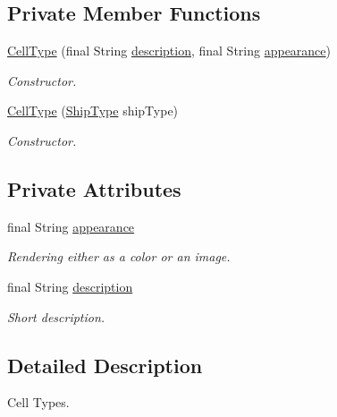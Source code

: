 \subsection*{Private Member Functions}
\begin{DoxyCompactItemize}
\item 
\hyperlink{enumbattleship2D_1_1model_1_1CellType_aea27835e7561cfecd0aedb835390d5fb}{Cell\-Type} (final String \hyperlink{enumbattleship2D_1_1model_1_1CellType_a523e78aea9b3eb082fcbe1af6f7580d2}{description}, final String \hyperlink{enumbattleship2D_1_1model_1_1CellType_a164d67bf5b6b674e63a766b9897ec3f4}{appearance})
\begin{DoxyCompactList}\small\item\em Constructor. \end{DoxyCompactList}\item 
\hyperlink{enumbattleship2D_1_1model_1_1CellType_a113ce6d9cd8bb4bae16752c42f9e521f}{Cell\-Type} (\hyperlink{enumbattleship2D_1_1model_1_1ShipType}{Ship\-Type} ship\-Type)
\begin{DoxyCompactList}\small\item\em Constructor. \end{DoxyCompactList}\end{DoxyCompactItemize}
\subsection*{Private Attributes}
\begin{DoxyCompactItemize}
\item 
final String \hyperlink{enumbattleship2D_1_1model_1_1CellType_a164d67bf5b6b674e63a766b9897ec3f4}{appearance}
\begin{DoxyCompactList}\small\item\em Rendering either as a color or an image. \end{DoxyCompactList}\item 
final String \hyperlink{enumbattleship2D_1_1model_1_1CellType_a523e78aea9b3eb082fcbe1af6f7580d2}{description}
\begin{DoxyCompactList}\small\item\em Short description. \end{DoxyCompactList}\end{DoxyCompactItemize}


\subsection{Detailed Description}
Cell Types. 

